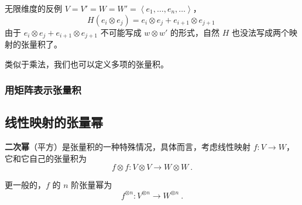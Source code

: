 

\begin{example}{无限维度的反例}
$V = V' = W = W' = \left\langle e_1, \dots, e_n, \dots \right\rangle$，
\begin{equation}
H(e_i \otimes e_j) = e_i \otimes e_j + e_{i + 1} \otimes e_{j + 1}~
\end{equation}
由于 $e_i \otimes e_j + e_{i + 1} \otimes e_{j + 1}$ 不可能写成 $w \otimes w'$ 的形式，自然 $H$ 也没法写成两个映射的张量积了。

\end{example}

类似于乘法，我们也可以定义多项的张量积。

\subsubsection{用矩阵表示张量积}


\subsection{线性映射的张量幂}


\textbf{二次幂}（平方）是张量积的一种特殊情况，具体而言，考虑线性映射 $f: V \to W$，它和它自己的张量积为
\begin{equation}
f \otimes f: V \otimes V \to W \otimes W~.
\end{equation}

更一般的，$f$ 的 $n$ 阶张量幂为
\begin{equation}
f^{\otimes n}: V^{\otimes n} \to W^{\otimes n}~.
\end{equation}

